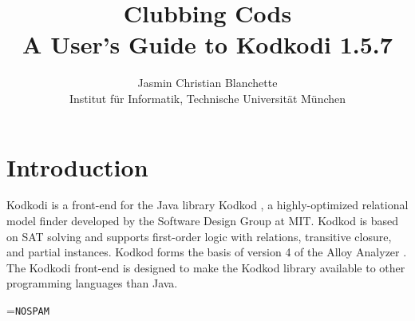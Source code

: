 \documentclass[a4paper,12pt]{article}
\begin{document}
    \title{Clubbing Cods \\[\smallskipamount]
    \Large A User's Guide to Kodkodi 1.5.7}
    \author{Jasmin Christian Blanchette \\
    {\normalsize Institut f\"ur Informatik, Technische Universit\"at M\"unchen}}

    \maketitle

    \tableofcontents

    \setlength{\parskip}{.7em plus .2em minus .1em}
    \setlength{\parindent}{0pt}
    \setlength{\abovedisplayskip}{\parskip}
    \setlength{\abovedisplayshortskip}{.9\parskip}
    \setlength{\belowdisplayskip}{\parskip}
    \setlength{\belowdisplayshortskip}{.9\parskip}

    \newenvironment{enum}%
    {\begin{list}{}{%
        \setlength{\topsep}{.1\parskip}%
        \setlength{\partopsep}{.1\parskip}%
        \setlength{\itemsep}{\parskip}%
        \advance\itemsep by-\parsep}}
    {\end{list}}

    \def\pre{\begingroup\vskip0pt plus1ex\advance\leftskip by\leftmargin
    \advance\rightskip by\leftmargin}
    \def\post{\vskip0pt plus1ex\endgroup}

    \def\prew{\pre\advance\rightskip by-\leftmargin}
    \def\postw{\post}

    \def\cpp{C\nobreak\raisebox{.1ex}{+}\nobreak\raisebox{.1ex}{+}}


    \section{Introduction}
    \label{introduction}

    Kodkodi is a front-end for the Java library Kodkod \cite{torlak-jackson-2007}, a
    highly-optimized relational model finder developed by the Software Design Group
    at MIT. Kodkod is based on SAT solving and supports first-order logic with
    relations, transitive closure, and partial instances. Kodkod forms the basis of
    version 4 of the Alloy Analyzer \cite{jackson-2006}. The Kodkodi
    front-end is designed to make the Kodkod library available to other programming
    languages than Java.

    \newbox\boxA
    \setbox\boxA=\hbox{\texttt{NOSPAM}}
\end{document}
